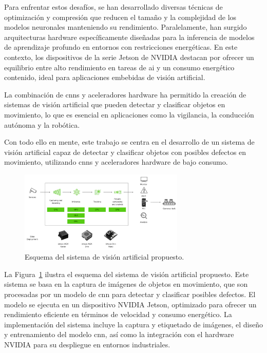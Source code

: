 \documentclass[11pt,spanish,listoffigures,listoftables]{tfgetsinf}
\begin{document}
Para enfrentar estos desafíos, se han desarrollado diversas técnicas de optimización y compresión que reducen el tamaño y la complejidad de los modelos neuronales manteniendo su rendimiento. Paralelamente, han surgido arquitecturas hardware específicamente diseñadas para la inferencia de modelos de aprendizaje profundo en entornos con restricciones energéticas. En este contexto, los dispositivos de la serie Jetson de NVIDIA\cite{nvidia_jetson_modules} destacan por ofrecer un equilibrio entre alto rendimiento en tareas de \gls{ai} y un consumo energético contenido, ideal para aplicaciones embebidas de visión artificial.

La combinación de \glspl{cnn} y aceleradores hardware ha permitido la creación de sistemas de visión artificial que pueden detectar y clasificar objetos en movimiento, lo que es esencial en aplicaciones como la vigilancia, la conducción autónoma y la robótica.

Con todo ello en mente, este trabajo se centra en el desarrollo de un sistema de visión artificial capaz de detectar y clasificar objetos con posibles defectos en movimiento, utilizando \glspl{cnn} y aceleradores hardware de bajo consumo. 

\begin{figure}[H]
   \centering
   \includegraphics[width=0.7\textwidth]{images/diseno_e_implementacion/figura_TFG_v3.png}
   \caption[Esquema del sistema de visión artificial propuesto]{Esquema del sistema de visión artificial propuesto.}
\label{fig:esquema_TFG}
\end{figure}

La Figura~\ref{fig:esquema_TFG} ilustra el esquema del sistema de visión artificial propuesto. Este sistema se basa en la captura de imágenes de objetos en movimiento, que son procesadas por un modelo de \gls{cnn} para detectar y clasificar posibles defectos. El modelo se ejecuta en un dispositivo NVIDIA Jetson, optimizado para ofrecer un rendimiento eficiente en términos de velocidad y consumo energético. La implementación del sistema incluye la captura y etiquetado de imágenes, el diseño y entrenamiento del modelo \gls{cnn}, así como la integración con el hardware NVIDIA para su despliegue en entornos industriales.
\end{document}
